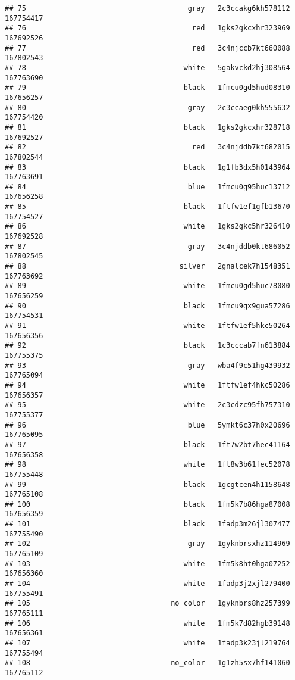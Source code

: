 \documentclass[
]{article}
\begin{document}
\begin{verbatim}
## 75                                      gray   2c3ccakg6kh578112 167754417
## 76                                       red   1gks2gkcxhr323969 167692526
## 77                                       red   3c4njccb7kt660088 167802543
## 78                                     white   5gakvckd2hj308564 167763690
## 79                                     black   1fmcu0gd5hud08310 167656257
## 80                                      gray   2c3ccaeg0kh555632 167754420
## 81                                     black   1gks2gkcxhr328718 167692527
## 82                                       red   3c4njddb7kt682015 167802544
## 83                                     black   1g1fb3dx5h0143964 167763691
## 84                                      blue   1fmcu0g95huc13712 167656258
## 85                                     black   1ftfw1ef1gfb13670 167754527
## 86                                     white   1gks2gkc5hr326410 167692528
## 87                                      gray   3c4njddb0kt686052 167802545
## 88                                    silver   2gnalcek7h1548351 167763692
## 89                                     white   1fmcu0gd5huc78080 167656259
## 90                                     black   1fmcu9gx9gua57286 167754531
## 91                                     white   1ftfw1ef5hkc50264 167656356
## 92                                     black   1c3cccab7fn613884 167755375
## 93                                      gray   wba4f9c51hg439932 167765094
## 94                                     white   1ftfw1ef4hkc50286 167656357
## 95                                     white   2c3cdzc95fh757310 167755377
## 96                                      blue   5ymkt6c37h0x20696 167765095
## 97                                     black   1ft7w2bt7hec41164 167656358
## 98                                     white   1ft8w3b61fec52078 167755448
## 99                                     black   1gcgtcen4h1158648 167765108
## 100                                    black   1fm5k7b86hga87008 167656359
## 101                                    black   1fadp3m26jl307477 167755490
## 102                                     gray   1gyknbrsxhz114969 167765109
## 103                                    white   1fm5k8ht0hga07252 167656360
## 104                                    white   1fadp3j2xjl279400 167755491
## 105                                 no_color   1gyknbrs8hz257399 167765111
## 106                                    white   1fm5k7d82hgb39148 167656361
## 107                                    white   1fadp3k23jl219764 167755494
## 108                                 no_color   1g1zh5sx7hf141060 167765112

\end{verbatim}
\end{document}
